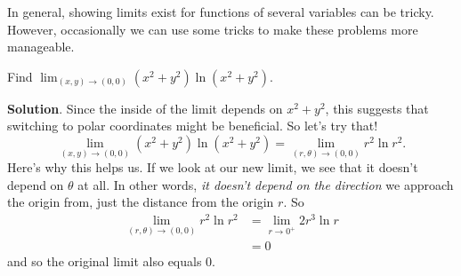\documentclass[10pt,]{book}
\theoremstyle{ptxplainnotitle}
\theoremstyle{ptxplaintitle}
\theoremstyle{ptxplainnotitle}
\theoremstyle{ptxplaintitle}
\theoremstyle{ptxplainnotitle}
\theoremstyle{ptxplaintitle}
\theoremstyle{ptxdefinitionnotitle}
\theoremstyle{ptxdefinitiontitle}
\theoremstyle{ptxdefinitionnotitle}
\theoremstyle{ptxdefinitiontitle}
\theoremstyle{ptxdefinitionnotitle}
\theoremstyle{ptxdefinitiontitle}
\theoremstyle{ptxdefinitionnotitle}
\theoremstyle{ptxdefinitiontitle}
\theoremstyle{ptxdefinitionnotitle}
\theoremstyle{ptxdefinitiontitle}
\numberwithin{equation}{section}
\begin{document}
\hypertarget{p-1002}{}%
In general, showing limits exist for functions of several variables can be tricky. However, occasionally we can use some tricks to make these problems more manageable.%
\begin{example}\label{example-showing-a-limit-exists}
\hypertarget{p-1003}{}%
Find \(\lim_{(x,y)\to(0,0)}(x^{2}+y^{2})\ln(x^{2}+y^{2})\).%
\par\smallskip%
\noindent\textbf{Solution}.\hypertarget{solution-153}{}\quad%
\hypertarget{p-1004}{}%
Since the inside of the limit depends on \(x^{2}+y^{2}\), this suggests that switching to polar coordinates might be beneficial. So let's try that!%
\begin{equation*}
\lim_{(x,y)\to(0,0)}(x^{2}+y^{2})\ln(x^{2}+y^{2}) = \lim_{(r,\theta)\to(0,0)}r^{2}\ln r^{2}.
\end{equation*}
Here's why this helps us. If we look at our new limit, we see that it doesn't depend on \(\theta\) at all. In other words, \emph{it doesn't depend on the direction} we approach the origin from, just the distance from the origin \(r\). So%
\begin{align*}
\lim_{(r,\theta)\to(0,0)}r^{2}\ln r^{2} & = \lim_{r\to0^{+}} 2r^{3}\ln r \\
& = 0 
\end{align*}
and so the original limit also equals \(0\).%
\end{example}
\typeout{************************************************}
\typeout{************************************************}
\end{document}
